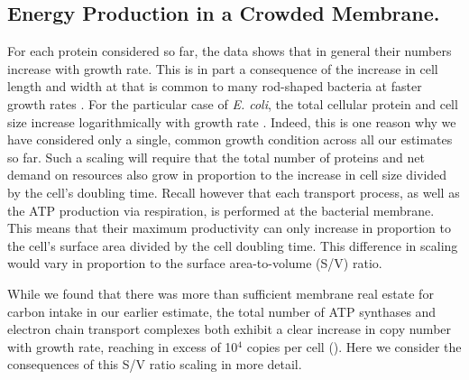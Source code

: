 \subsection{Energy Production in a Crowded Membrane.}

For each protein considered so far, the data shows that in general their numbers
increase with growth rate. This is in part a consequence of the increase in cell
length and width at that is common to many rod-shaped bacteria at faster growth
rates \citep{ojkic2019, harris2018}. For the particular case of \textit{E.
coli}, the total cellular protein and cell size increase logarithmically with
growth rate \citep{schaechter1958, si2017}. Indeed, this is one reason why we
have considered only a single, common growth condition across all our estimates
so far. Such a scaling will require that the total number of proteins and net
demand on resources also grow in proportion to the increase in cell size divided
by the cell's doubling time. Recall however that each transport process, as well
as the ATP production via respiration, is performed at the bacterial membrane.
This means that their maximum productivity can only increase in proportion to
the cell's surface area divided by the cell doubling time. This difference in
scaling would vary in proportion to the surface area-to-volume (S/V) ratio.

While we found that there was more than sufficient membrane real estate for
carbon intake in our earlier estimate, the total number of ATP synthases and
electron chain transport complexes both exhibit a clear increase in copy number
with growth rate, reaching in excess of 10$^4$ copies per cell
(). Here we consider the consequences of this
S/V ratio scaling in more detail.

